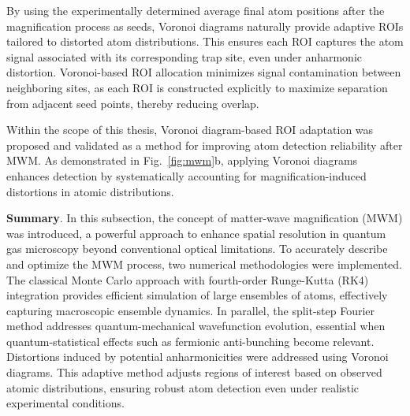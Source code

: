 By using the experimentally determined average final atom positions after the magnification process as seeds, Voronoi diagrams naturally provide adaptive ROIs tailored to distorted atom distributions. This ensures each ROI captures the atom signal associated with its corresponding trap site, even under anharmonic distortion. Voronoi-based ROI allocation minimizes signal contamination between neighboring sites, as each ROI is constructed explicitly to maximize separation from adjacent seed points, thereby reducing overlap.

Within the scope of this thesis, Voronoi diagram-based ROI adaptation was proposed and validated as a method for improving atom detection reliability after MWM. As demonstrated in Fig.~\ref{fig:mwm}b, applying Voronoi diagrams enhances detection by systematically accounting for magnification-induced distortions in atomic distributions. 


\textbf{Summary}. In this subsection, the concept of matter-wave magnification (MWM) was introduced, a powerful approach to enhance spatial resolution in quantum gas microscopy beyond conventional optical limitations.
To accurately describe and optimize the MWM process, two numerical methodologies were implemented. The classical Monte Carlo approach with fourth-order Runge-Kutta (RK4) integration provides efficient simulation of large ensembles of atoms, effectively capturing macroscopic ensemble dynamics. In parallel, the split-step Fourier method addresses quantum-mechanical wavefunction evolution, essential when quantum-statistical effects such as fermionic anti-bunching become relevant. Distortions induced by potential anharmonicities were addressed using Voronoi diagrams. This adaptive method adjusts regions of interest based on observed atomic distributions, ensuring robust atom detection even under realistic experimental conditions.

